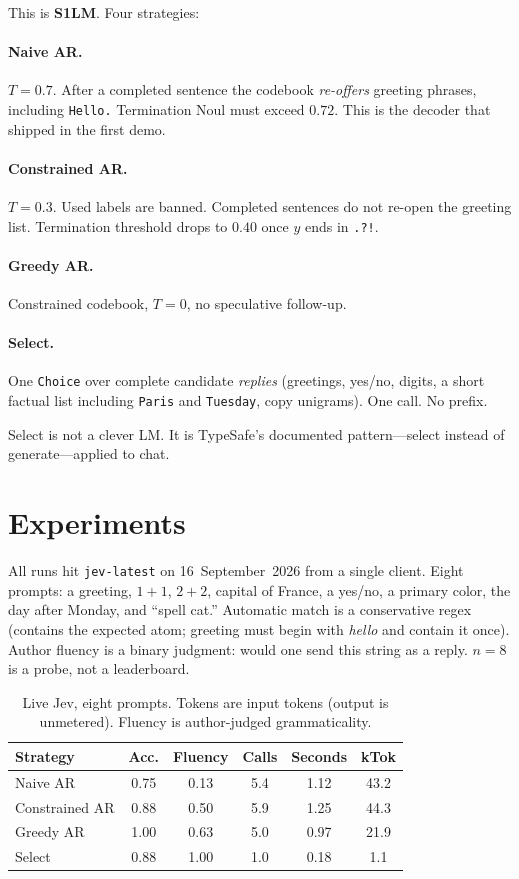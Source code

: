 \documentclass[11pt,twocolumn]{article}
\begin{document}
This is \textbf{S1LM}. Four strategies:

\paragraph{Naive AR.} $T{=}0.7$. After a completed sentence the codebook \emph{re-offers} greeting phrases, including \texttt{Hello.} Termination Noul must exceed $0.72$. This is the decoder that shipped in the first demo.

\paragraph{Constrained AR.} $T{=}0.3$. Used labels are banned. Completed sentences do not re-open the greeting list. Termination threshold drops to $0.40$ once $y$ ends in \texttt{.?!}.

\paragraph{Greedy AR.} Constrained codebook, $T{=}0$, no speculative follow-up.

\paragraph{Select.} One \texttt{Choice} over complete candidate \emph{replies} (greetings, yes/no, digits, a short factual list including \texttt{Paris} and \texttt{Tuesday}, copy unigrams). One call. No prefix.

Select is not a clever LM. It is TypeSafe's documented pattern---select instead of generate---applied to chat.

\section{Experiments}

All runs hit \texttt{jev-latest} on 16~September~2026 from a single client. Eight prompts: a greeting, $1{+}1$, $2{+}2$, capital of France, a yes/no, a primary color, the day after Monday, and ``spell cat.'' Automatic match is a conservative regex (contains the expected atom; greeting must begin with \emph{hello} and contain it once). Author fluency is a binary judgment: would one send this string as a reply. $n{=}8$ is a probe, not a leaderboard.

\begin{table}[t]
\centering
\scriptsize
\caption{Live Jev, eight prompts. Tokens are input tokens (output is unmetered). Fluency is author-judged grammaticality.}
\label{tab:main}
\begin{tabular}{@{}lccccc@{}}
\toprule
Strategy & Acc. & Fluency & Calls & Seconds & kTok \\
\midrule
Naive AR & 0.75 & 0.13 & 5.4 & 1.12 & 43.2 \\
Constrained AR & 0.88 & 0.50 & 5.9 & 1.25 & 44.3 \\
Greedy AR & 1.00 & 0.63 & 5.0 & 0.97 & 21.9 \\
Select & 0.88 & 1.00 & 1.0 & 0.18 & 1.1 \\
\bottomrule
\end{tabular}
\end{table}
\end{document}
